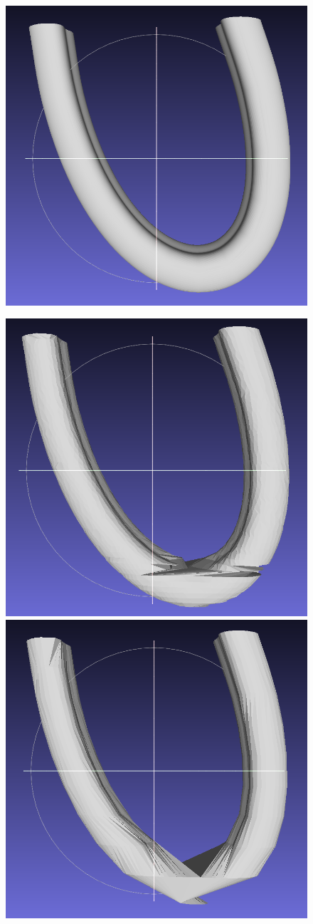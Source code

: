 \documentclass[11p, titlepage]{article}
\newcommand{\reconstructionleft}{0.3}
\newcommand{\reconstructionright}{0.67}
\begin{document}
\begin{figure}[h!]
     \centering
     \begin{minipage}[b]{\reconstructionleft\linewidth}
       {\includegraphics[width=\linewidth]{originals/bend}}%
     \end{minipage}%
     \hfill
     \begin{minipage}[b]{\reconstructionright\linewidth}
       {\includegraphics[width=.48\linewidth]{reconstructions/dtw-bend-50}}%
       \hfill
       {\includegraphics[width=.48\linewidth]{reconstructions/dtw-bend-10}}

\end{minipage}
\end{figure}
\end{document}
